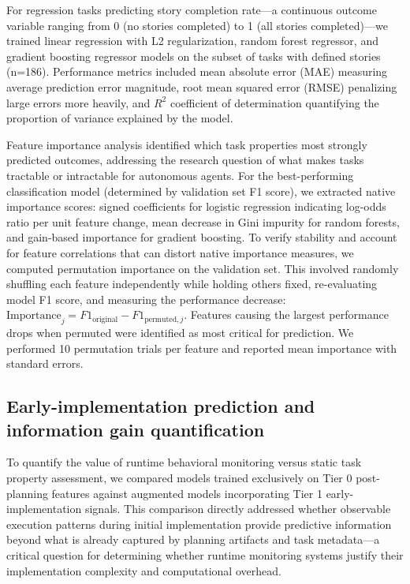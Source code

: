 \documentclass[]{article}
\begin{document}
For regression tasks predicting story completion rate—a continuous outcome variable ranging from 0 (no stories completed) to 1 (all stories completed)—we trained linear regression with L2 regularization, random forest regressor, and gradient boosting regressor models on the subset of tasks with defined stories (n=186). Performance metrics included mean absolute error (MAE) measuring average prediction error magnitude, root mean squared error (RMSE) penalizing large errors more heavily, and $R^2$ coefficient of determination quantifying the proportion of variance explained by the model.

Feature importance analysis identified which task properties most strongly predicted outcomes, addressing the research question of what makes tasks tractable or intractable for autonomous agents. For the best-performing classification model (determined by validation set F1 score), we extracted native importance scores: signed coefficients for logistic regression indicating log-odds ratio per unit feature change, mean decrease in Gini impurity for random forests, and gain-based importance for gradient boosting. To verify stability and account for feature correlations that can distort native importance measures, we computed permutation importance on the validation set. This involved randomly shuffling each feature independently while holding others fixed, re-evaluating model F1 score, and measuring the performance decrease: $\text{Importance}_j = F1_{\text{original}} - F1_{\text{permuted},j}$. Features causing the largest performance drops when permuted were identified as most critical for prediction. We performed 10 permutation trials per feature and reported mean importance with standard errors.

\subsection{Early-implementation prediction and information gain quantification}

To quantify the value of runtime behavioral monitoring versus static task property assessment, we compared models trained exclusively on Tier 0 post-planning features against augmented models incorporating Tier 1 early-implementation signals. This comparison directly addressed whether observable execution patterns during initial implementation provide predictive information beyond what is already captured by planning artifacts and task metadata—a critical question for determining whether runtime monitoring systems justify their implementation complexity and computational overhead.
\end{document}
